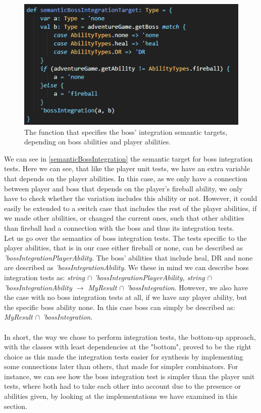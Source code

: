 \begin{figure}[]
    \centering
    \includegraphics[width=0.6\linewidth]{Materials/TestingDiscussion/semanticBossIntegrationTarget}
    \caption{The function that specifies the boss' integration semantic targets, depending on boss abilities and player abilities.}
    \label{semanticBossIntegration}
\end{figure}
We can see in \autoref{semanticBossIntegration} the semantic target for boss integration tests. Here we can see, that like the player unit tests, we have an extra variable that depends on the player abilities. In this case, as we only have a connection between player and boss that depends on the player's fireball ability, we only have to check whether the variation includes this ability or not. However, it could easily be extended to a switch case that includes the rest of the player abilities, if we made other abilities, or changed the current ones, such that other abilities than fireball had a connection with the boss and thus its integration tests. \\
Let us go over the semantics of boss integration tests. The tests specific to the player abilities, that is in our case either fireball or none, can be described as \textit{'bossIntegrationPlayerAbility}. The boss' abilities that include heal, DR and none are described as \textit{'bossIntegrationAbility}. We these in mind we  can describe boss integration tests as: \textit{string $\cap$ 'bossIntegrationPlayerAbility, string $\cap$ 'bossIntegrationAbility $\to$ MyResult $\cap$ 'bossIntegration}. However, we also have the case with no boss integration tests at all, if we have any player ability, but the specific boss ability none. In this case boss can simply be described as: \textit{MyResult $\cap$ 'bossIntegration}. \\
\\
In short, the way we chose to perform integration tests, the bottom-up approach, with the classes with least dependencies at the "bottom", proved to be the right choice as this made the integration tests easier for synthesis by implementing some connections later than others, that made for simpler combinators. For instance, we can see how the boss integration test is simpler than the player unit tests, where both had to take each other into account due to the presence or abilities given, by looking at the implementations we have examined in this section. \\
